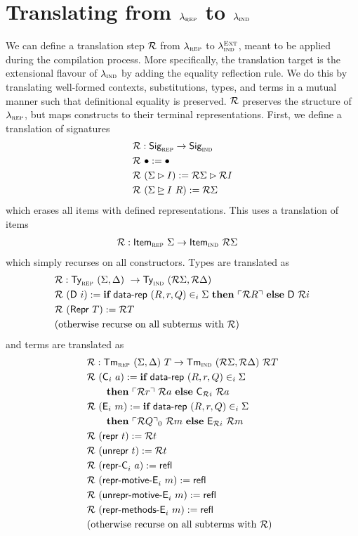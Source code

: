 \section{Translating from $\lambda_{\textsc{rep}}$ to $\lambda_{\textsc{ind}}$}

We can define a translation step $\mathcal{R}$ from $\lambda_{\textsc{rep}}$ to
$\lambda_{\textsc{ind}}^{\textsc{Ext}}$, meant to be applied during the compilation process.
More specifically, the translation target is the extensional flavour of
$\lambda_{\textsc{ind}}$ by adding the equality reflection rule. We do this by translating
well-formed contexts, substitutions, types, and terms in a mutual manner such
that definitional equality is preserved.
$\mathcal{R}$ preserves the structure of
$\lambda_{\textsc{rep}}$, but maps constructs to their terminal representations.
First, we define a translation of signatures
\begin{align*}
& \mathcal{R} : \textsf{Sig}_{\textsc{rep}} \to \textsf{Sig}_{\textsc{ind}} \\
& \mathcal{R}\ \bullet := \bullet \\
& \mathcal{R}\ (\Sigma \rhd I) := \mathcal{R} \Sigma \rhd \mathcal{R} I \\
& \mathcal{R}\ (\Sigma \unrhd I \ R) := \mathcal{R} \Sigma
\end{align*}
which erases all items with defined representations.
This uses a translation of items
\begin{align*}
& \mathcal{R} : \textsf{Item}_{\textsc{rep}}\ \Sigma \to \textsf{Item}_{\textsc{ind}}\ \mathcal{R} \Sigma
\end{align*}
which simply recurses on all constructors. Types are translated as
\begin{align*}
  & \mathcal{R} : \textsf{Ty}_{\textsc{rep}}\ (\Sigma, \Delta)\ \to \textsf{Ty}_{\textsc{ind}}\ (\mathcal{R} \Sigma, \mathcal{R} \Delta) \\
  & \mathcal{R}\ (\textsf{D}\ i) := \textbf{if}\ \textsf{data-rep}\ (R, r, Q) \in_i \Sigma\ \textbf{then}\ \ulcorner \mathcal{R} R \urcorner\ \textbf{else}\ \textsf{D}\ \mathcal{R} i \\
  & \mathcal{R}\ (\textsf{Repr}\ T) := \mathcal{R} T \\
  & \text{(otherwise recurse on all subterms with $\mathcal{R}$)}
\end{align*}
and terms are translated as
\begin{align*}
  & \mathcal{R} : \textsf{Tm}_{\textsc{rep}}\ (\Sigma, \Delta)\ T \to \textsf{Tm}_{\textsc{ind}}\ (\mathcal{R} \Sigma, \mathcal{R} \Delta)\ \mathcal{R} T \\
  & \mathcal{R}\ (\textsf{C}_i\ a) := \textbf{if}\ \textsf{data-rep}\ (R, r, Q) \in_i \Sigma\ \\
    &\qquad \textbf{then}\ \ulcorner \mathcal{R} r \urcorner\ \mathcal{R} a\ \textbf{else}\ \textsf{C}_{\mathcal{R} i}\ \mathcal{R} a \\
  & \mathcal{R}\ (\textsf{E}_i\ m) :=  \textbf{if}\ \textsf{data-rep}\ (R, r, Q) \in_i \Sigma\ \\
    &\qquad \textbf{then}\ \ulcorner \mathcal{R} Q \urcorner_0\ \mathcal{R} m\ \textbf{else}\ \textsf{E}_{\mathcal{R} i}\ \mathcal{R} m \\
  & \mathcal{R}\ (\textsf{repr}\ t) := \mathcal{R} t \\
  & \mathcal{R}\ (\textsf{unrepr}\ t) := \mathcal{R} t \\
  & \mathcal{R}\ (\textsf{repr-C}_i\ a) := \textsf{refl} \\
  & \mathcal{R}\ (\textsf{repr-motive-E}_i\ m) := \textsf{refl} \\
  & \mathcal{R}\ (\textsf{unrepr-motive-E}_i\ m) := \textsf{refl} \\
  & \mathcal{R}\ (\textsf{repr-methods-E}_i\ m) := \textsf{refl} \\
  & \text{(otherwise recurse on all subterms with $\mathcal{R}$)}
\end{align*}

